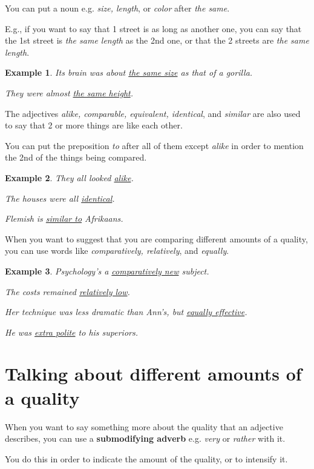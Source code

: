 \documentclass[oneside]{book}
\numberwithin{equation}{section}
\newtheorem{example}{Example}[section]
\begin{document}
%
\noindent{} You can put a noun e.g. \textit{size, length}, or \textit{color} after \textit{the same}.

E.g., if you want to say that 1 street is as long as another one, you can say that the 1st street is \textit{the same length} as the 2nd one, or that the 2 streets are \textit{the same length}.
\begin{example}
    Its brain was about \underline{the same size} as that of a gorilla.
    
    They were almost \underline{the same height}.
\end{example}
%
\noindent{} The adjectives \textit{alike, comparable, equivalent, identical}, and \textit{similar} are also used to say that 2 or more things are like each other.

You can put the preposition \textit{to} after all of them except \textit{alike} in order to mention the 2nd of the things being compared.
\begin{example}
    They all looked \underline{alike}.
    
    The houses were all \underline{identical}.
    
    Flemish is \underline{similar to} Afrikaans.
\end{example}
%
\noindent{} When you want to suggest that you are comparing different amounts of a quality, you can use words like \textit{comparatively, relatively}, and \textit{equally}.
\begin{example}
    Psychology's a \underline{comparatively new} subject.
    
    The costs remained \underline{relatively low}.
    
    Her technique was less dramatic than Ann's, but \underline{equally effective}.
    
    He was \underline{extra polite} to his superiors.
\end{example}

\section{Talking about different amounts of a quality}
\noindent{} When you want to say something more about the quality that an adjective describes, you can use a \textbf{submodifying adverb} e.g. \textit{very} or \textit{rather} with it.

You do this in order to indicate the amount of the quality, or to intensify it.
\end{document}
